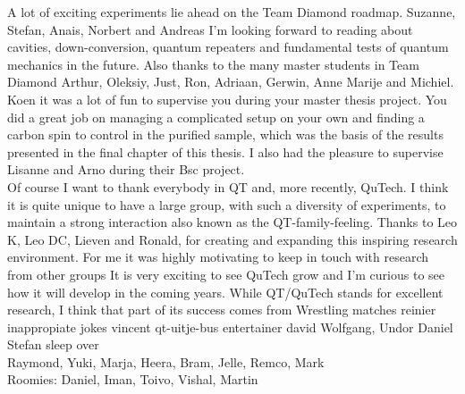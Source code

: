 \documentclass{report}
\begin{document}
A lot of exciting experiments lie ahead on the Team Diamond roadmap. Suzanne, Stefan, Anais, Norbert and Andreas I'm looking forward to reading about cavities, down-conversion, quantum repeaters and fundamental tests of quantum mechanics in the future. Also thanks to the many master students in Team Diamond Arthur, Oleksiy, Just, Ron, Adriaan, Gerwin, Anne Marije and Michiel. Koen it was a lot of fun to supervise you during your master thesis project. You did a great job on managing a complicated setup on your own and finding a carbon spin to control in the purified sample, which was the basis of the results presented in the final chapter of this thesis. I also had the pleasure to supervise Lisanne and Arno during their Bsc project. \\

Of course I want to thank everybody in QT and, more recently, QuTech. I think it is quite unique to have a large group, with such a diversity of experiments, to maintain a strong interaction also known as the QT-family-feeling. Thanks to Leo K, Leo DC, Lieven and Ronald, for creating and expanding this inspiring research environment. For me it was highly motivating to keep in touch with research from other groups It is very exciting to see QuTech grow and I'm curious to see how it will develop in the coming years. While QT/QuTech stands for excellent research, I think that part of its success comes from
Wrestling matches reinier
inappropiate jokes vincent
qt-uitje-bus entertainer david
Wolfgang, Undor Daniel Stefan sleep over \\
\newpage
Raymond, Yuki, Marja, Heera, Bram, Jelle, Remco, Mark \\
Roomies: Daniel, Iman, Toivo, Vishal, Martin \\
\end{document}
